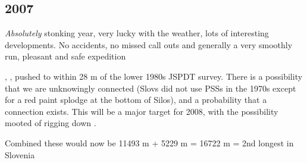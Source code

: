 \begin{tcolorbox}
\chapter{2007}
\textit{Absolutely} stonking year, very lucky with the weather, lots of
interesting developments. No accidents, no missed call outs and
generally a very smoothly run, pleasant and safe expedition

, , pushed to within 28 m of the lower  1980s JSPDT survey. There is a possibility that we are unknowingly connected (Slovs did not use PSSs in the 1970s except for a red paint splodge at the bottom of Silos), and a probability that a connection exists. This will be a major target for 2008, with the possibility mooted of rigging down .

Combined these would now be 11493 m + 5229 m = 16722 m = 2nd longest in Slovenia

\end{tcolorbox}
\BgThispage
